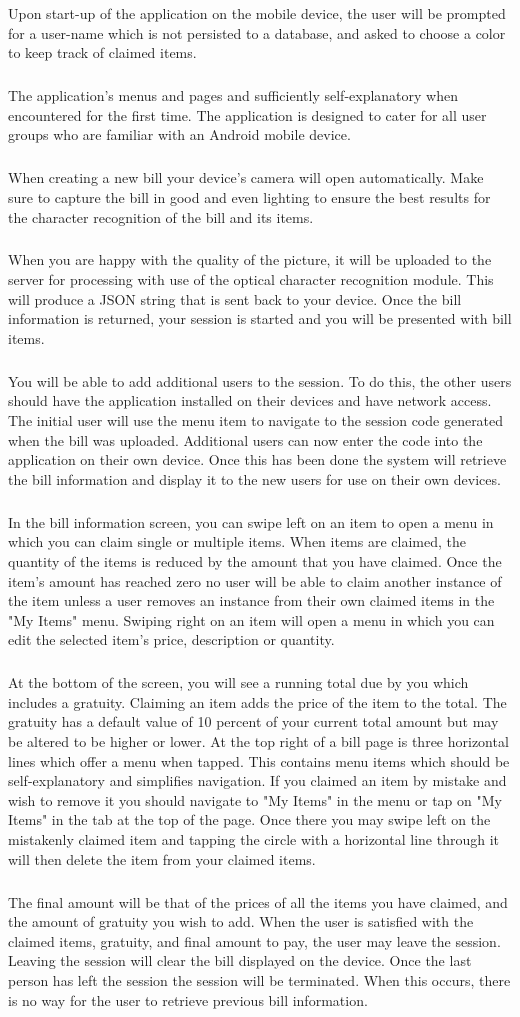 \documentclass[12pt,a4paper]{article}
\begin{document}
Upon start-up of the application on the mobile device, the user will be prompted for a user-name which is not persisted to a database, and asked to choose a color to keep track of claimed items.
\subparagraph{}
The application's menus and pages and sufficiently self-explanatory when encountered for the first time. The application is designed to cater for all user groups who are familiar with an Android mobile device. 
\subparagraph{}
When creating a new bill your device's camera will open automatically. Make sure to capture the bill in good and even lighting to ensure the best results for the character recognition of the bill and its items.
\subparagraph{}
When you are happy with the quality of the picture, it will be uploaded to the server for processing with use of the optical character recognition module. This will produce a JSON string that is sent back to your device. Once the bill information is returned, your session is started and you will be presented with bill items. 
\subparagraph{}
You will be able to add additional users to the session. To do this, the other users should have the application installed on their devices and have network access. The initial user will use the menu item to navigate to the session code generated when the bill was uploaded. Additional users can now enter the code into the application on their own device. Once this has been done the system will retrieve the bill information and display it to the new users for use on their own devices. 
\subparagraph{}
In the bill information screen, you can swipe left on an item to open a menu in which you can claim single or multiple items. When items are claimed, the quantity of the items is reduced by the amount that you have claimed. Once the item’s amount has reached zero no user will be able to claim another instance of the item unless a user removes an instance from their own claimed items in the "My Items" menu. Swiping right on an item will open a menu in which you can edit the selected item's price, description or quantity. 
\subparagraph{}
At the bottom of the screen, you will see a running total due by you which includes a gratuity. Claiming an item adds the price of the item to the total. The gratuity has a default value of 10 percent of your current total amount but may be altered to be higher or lower. 
At the top right of a bill page is three horizontal lines which offer a menu when tapped. This contains menu items which should be self-explanatory and simplifies navigation. 
If you claimed an item by mistake and wish to remove it you should navigate to "My Items" in the menu or tap on "My Items" in the tab at the top of the page. Once there you may swipe left on the mistakenly claimed item and tapping the circle with a horizontal line through it will then delete the item from your claimed items.
\subparagraph{}
The final amount will be that of the prices of all the items you have claimed, and the amount of gratuity you wish to add. When the user is satisfied with the claimed items, gratuity, and final amount to pay, the user may leave the session. Leaving the session will clear the bill displayed on the device. Once the last person has left the session the session will be terminated. When this occurs, there is no way for the user to retrieve previous bill information.
\end{document}
